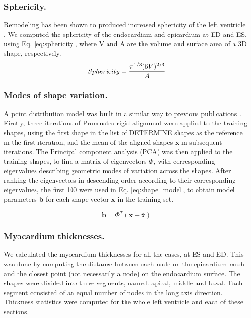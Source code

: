\documentclass{llncs}
\begin{document}
\subsubsection{Sphericity.}Remodeling has been shown to produced increased sphericity of the left ventricle \cite{Sutton2000}. We  computed the sphericity \cite{Wadell1933} of the endocardium and epicardium at ED and ES, using Eq. \ref{eq:sphericity}, where V and A are the volume and surface area of a 3D shape, respectively. 
\begin{equation} \label{eq:sphericity}
 Sphericity = \cfrac{\pi^{1/3}(6V)^{2/3}}{A} 
\end{equation}

\subsubsection{Modes of shape variation.}
A point distribution model was built in a similar way to previous publications \cite{VanAssen2006,Lotjonen2004}. Firstly, three iterations of Procrustes rigid alignment were applied to the training shapes, using the first shape in the list of DETERMINE shapes as the reference in the first iteration, and the mean of the aligned shapes $\bar{\textbf{x}} $ in subsequent iterations. The Principal component analysis (PCA) was then applied to the training shapes, to find a matrix of eigenvectors $\Phi$, with corresponding eigenvalues describing geometric modes of variation across the shapes. After ranking the eigenvectors in descending order according to their corresponding eigenvalues, the first 100 were used in Eq. \ref{eq:shape_model}, to obtain model parameters $\textbf{b} $ for each shape vector $ \textbf{x} $ in the training set.  

\begin{equation} \label{eq:shape_model}
\textbf{b} = \Phi^T(\textbf{x} - \bar{\textbf{x}} )
\end{equation}

\subsubsection{Myocardium thicknesses.}
We calculated the myocardium thicknesses for all the cases, at ES and ED. This was done by computing the distance between each node on the epicardium mesh and the closest point (not necessarily a node) on the endocardium surface. The shapes were divided into three segments, named: apical, middle and basal. Each segment consisted of an equal number of nodes in the long axis direction. Thickness statistics were computed for the whole left ventricle and each of these sections.
\end{document}
